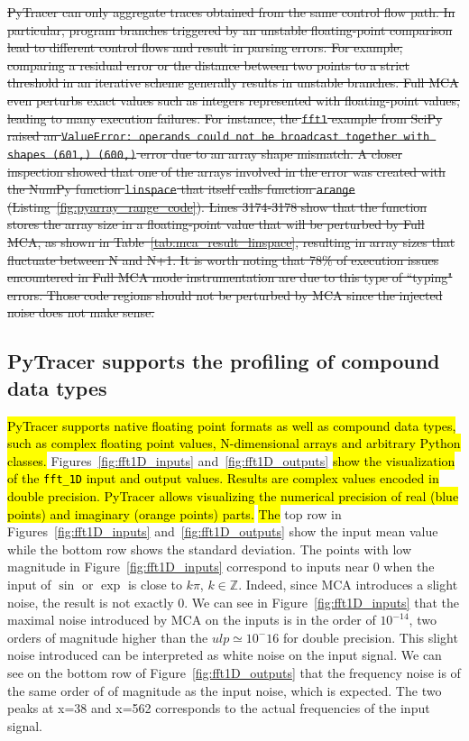 \documentclass[10pt,journal,compsoc]{IEEEtran}
\newcommand{\pytracer}[0]{PyTracer\xspace}
\DeclareRobustCommand{\add}[1]{\sethlcolor{lightgreen}\hl{#1}}
\DeclareRobustCommand{\remove}[1]{\textcolor{lightred}{\sout{#1}}}
\begin{document}
\remove{\pytracer can only aggregate traces obtained from the same control flow path. In
    particular, program branches triggered by an unstable floating-point comparison
    lead to different control flows and result in parsing errors. For example,
    comparing a residual error or the distance between two points to a strict
    threshold in an iterative scheme generally results in unstable branches. Full
    MCA even perturbs exact values such as integers represented with floating-point
    values, leading to many execution failures. For instance, the \texttt{fft1}
    example from SciPy raised an \texttt{ValueError: operands could not be broadcast
        together with shapes (601,) (600,)} error due to an array shape mismatch. A
    closer inspection showed that one of the arrays involved in the error was
    created with the NumPy function \texttt{linspace} that itself calls function
    \texttt{arange} (Listing~\ref{fig:pyarray_range_code}). Lines 3174-3178 show
    that the function stores the array size in a floating-point value that will be
    perturbed by Full MCA, as shown in Table~\ref{tab:mca_result_linspace},
    resulting in array sizes that fluctuate between N and N+1. It is worth noting
    that 78\% of execution issues encountered in Full MCA mode instrumentation are
    due to this type of ``typing" errors.  
    Those code regions should not be perturbed by MCA since the injected noise does
    not make sense.}

\subsection{\pytracer supports the profiling of compound data types}

\add{PyTracer supports native floating point formats as well as compound data types,
    such as complex floating point values, N-dimensional arrays and arbitrary Python
    classes.}
Figures~\ref{fig:fft1D_inputs} and~\ref{fig:fft1D_outputs} \add{show the
    visualization of the \texttt{fft\_1D} input and output values. Results are
    complex values encoded in double precision. PyTracer allows visualizing the
    numerical precision of real (blue points) and imaginary (orange points) parts.}
\add{The} top row in Figures~\ref{fig:fft1D_inputs} and~\ref{fig:fft1D_outputs}
show the input mean value while the bottom row shows the standard deviation. The
points with low magnitude in Figure~\ref{fig:fft1D_inputs} correspond to inputs
near 0 when the input of $\sin$ or $\exp$ is close to $k\pi$, $k \in
    \mathbb{Z}$. Indeed, since MCA introduces a slight noise, the result is not
exactly 0. We can see in Figure~\ref{fig:fft1D_inputs} that the maximal noise
introduced by MCA on the inputs is in the order of $10^{-14}$, two orders of
magnitude higher than the $ulp \simeq 10^-16$ for double precision. This slight
noise introduced can be interpreted as white noise on the input signal. We can
see on the bottom row of Figure~\ref{fig:fft1D_outputs} that the frequency noise
is of the same order of of magnitude as the input noise, which is expected. The
two peaks at x=38 and x=562 corresponds to the actual frequencies of the input
signal.
\end{document}

